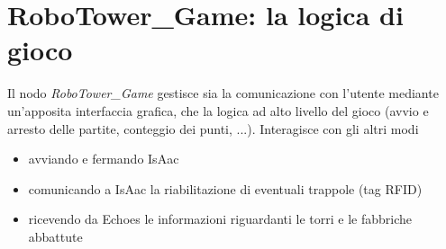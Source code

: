 
\section{RoboTower\_Game: la logica di gioco}
Il nodo \emph{RoboTower\_Game} gestisce sia la comunicazione con l'utente mediante un'apposita interfaccia grafica, che la logica ad alto livello del gioco (avvio e arresto delle partite, conteggio dei punti, ...). Interagisce con gli altri modi
\begin{itemize}
\item avviando e fermando IsAac
\item comunicando a IsAac la riabilitazione di eventuali trappole (tag RFID)
\item ricevendo da Echoes le informazioni riguardanti le torri e le fabbriche abbattute
\end{itemize}

